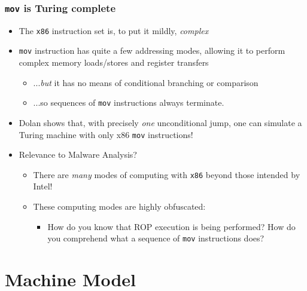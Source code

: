 \documentclass{beamer}
\begin{document}
\begin{frame}[fragile]
\frametitle{{\tt mov} is Turing complete}

\begin{itemize}
\item The \verb+x86+ instruction set is, to put it mildly, \emph{complex}
\pause
\item \verb+mov+ instruction has quite a few addressing modes, allowing it to perform complex memory loads/stores and register transfers

\pause
\begin{itemize}
\item ...\emph{but} it has no means of conditional branching or comparison
\item ...so sequences of \verb+mov+ instructions always terminate.
\end{itemize}
\pause

\item Dolan shows that, with precisely \emph{one} unconditional jump, one can simulate a Turing machine with only x86 \verb+mov+ instructions!
\pause

\item Relevance to Malware Analysis?
\pause
\begin{itemize}
\item There are \emph{many} modes of computing with {\tt x86} beyond those intended by Intel!
\pause
\item These computing modes are highly obfuscated:
\begin{itemize}
\item How do you know that ROP execution is being performed? How do you comprehend what a sequence of \verb+mov+ instructions does?
\end{itemize}
\end{itemize}

\end{itemize}

\end{frame}

\section{Machine Model}
\end{document}
